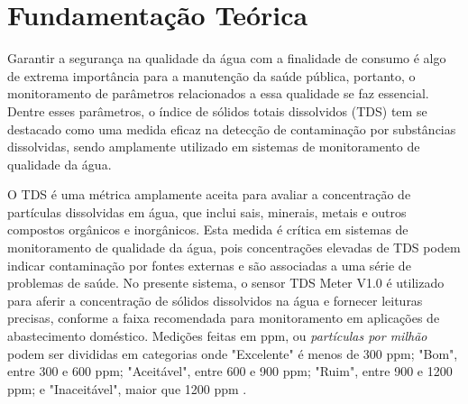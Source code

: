 \documentclass[12pt]{article}
\begin{document}
\iffalse
    \begin{itemize}
        \item Desenvolver um dispositivo com a capacidade de coletar o nível de TDS de uma fonte de água, tal como um poço artesiano;
        \item Coletar e tratar os dados recebidos por esse dispositivo;
        \item Usar esses dados tratados em uma interface gráfica;
    \end{itemize}
\fi

\section{Fundamentação Teórica}

Garantir a segurança na qualidade da água com a finalidade de consumo é algo de extrema importância para a manutenção da saúde pública, portanto, o monitoramento de parâmetros relacionados a essa qualidade se faz essencial. Dentre esses parâmetros, o índice de sólidos totais dissolvidos (TDS) tem se destacado como uma medida eficaz na detecção de contaminação por substâncias dissolvidas, sendo amplamente utilizado em sistemas de monitoramento de qualidade da água. 

O TDS é uma métrica amplamente aceita para avaliar a concentração de partículas dissolvidas em água, que inclui sais, minerais, metais e outros compostos orgânicos e inorgânicos. Esta medida é crítica em sistemas de monitoramento de qualidade da água, pois concentrações elevadas de TDS podem indicar contaminação por fontes externas e são associadas a uma série de problemas de saúde. No presente sistema, o sensor TDS Meter V1.0 é utilizado para aferir a concentração de sólidos dissolvidos na água e fornecer leituras precisas, conforme a faixa recomendada para monitoramento em aplicações de abastecimento doméstico. Medições feitas em ppm, ou \textit{partículas por milhão} podem ser divididas em categorias onde "Excelente" é menos de 300 ppm; "Bom", entre 300 e 600 ppm; "Aceitável", entre 600 e 900 ppm; "Ruim", entre 900 e 1200 ppm; e "Inaceitável", maior que 1200 ppm \cite{islam2017assessment}. 

\end{document}
